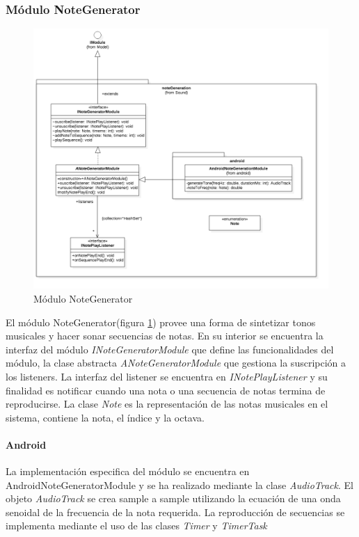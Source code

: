 \subsubsection{Módulo NoteGenerator}
\begin{figure}
	\centering
	\includegraphics[width=1\linewidth]{imagenes/diagramas/NoteGenerationModule.png}
	\caption{Módulo NoteGenerator}
	\label{fig:note-generator-module}
\end{figure}
El módulo NoteGenerator(figura \ref{fig:note-generator-module}) provee una forma de sintetizar tonos musicales y hacer sonar secuencias de notas.
En su interior se encuentra la interfaz del módulo \textit{INoteGeneratorModule} que define las funcionalidades del módulo, la clase abstracta \textit{ANoteGeneratorModule} que gestiona la suscripción a los listeners. La interfaz del listener se encuentra en \textit{INotePlayListener} y su finalidad es notificar cuando una nota o una secuencia de notas termina de reproducirse. La clase \textit{Note} es la representación de las notas musicales en el sistema, contiene la nota, el índice y la octava.

\paragraph*{Android\\}

La implementación especifica del módulo se encuentra en AndroidNoteGeneratorModule y se ha realizado mediante la clase \textit{AudioTrack}. El objeto \textit{AudioTrack} se crea sample a sample utilizando la ecuación de una onda senoidal de la frecuencia de la nota requerida. La reproducción de secuencias se implementa mediante el uso de las clases \textit{Timer} y \textit{TimerTask}

